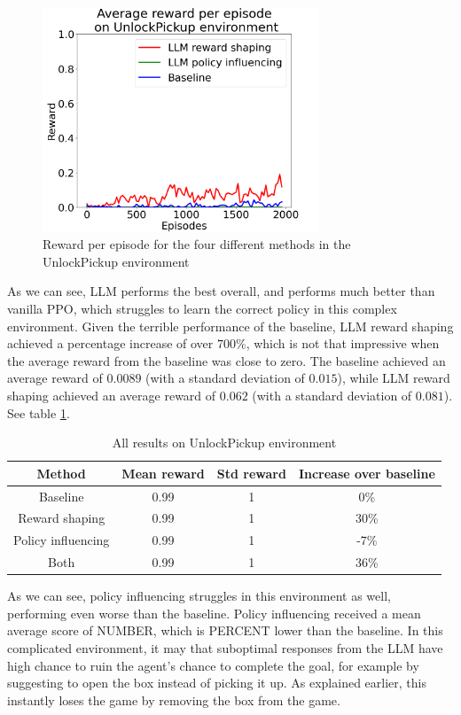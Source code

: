\documentclass[conference]{IEEEtran}
\begin{document}
\begin{figure}[h]
\centerline{\includegraphics[width=3.25in]{figure/unlockpickupresults.png}}
\caption{Reward per episode for the four different methods in the UnlockPickup environment}
\label{unlockpickupresults}
\end{figure}

As we can see, LLM performs the best overall, and performs much better than vanilla PPO, which struggles to learn the correct policy in this complex environment. Given the terrible performance of the baseline, LLM reward shaping achieved a percentage increase of over $700\%$, which is not that impressive when the average reward from the baseline was close to zero. The baseline achieved an average reward of $0.0089$ (with a standard deviation of $0.015$), while LLM reward shaping achieved an average reward of $0.062$ (with a standard deviation of $0.081$). See table \ref{unlockpickuptable}.

\begin{table}[h]
\caption{All results on UnlockPickup environment}
\begin{center}
\label{unlockpickuptable}
\begin{tabular}{c | c c c}
Method & Mean reward & Std reward & Increase over baseline \\
\hline
Baseline & 0.99 & 1 & 0\% \\
Reward shaping & 0.99 & 1 & 30\% \\
Policy influencing & 0.99 & 1 & -7\% \\
Both & 0.99 & 1 & 36\% \\
\end{tabular}
\end{center}
\end{table}

As we can see, policy influencing struggles in this environment as well, performing even worse than the baseline. Policy influencing received a mean average score of NUMBER, which is PERCENT lower than the baseline. In this complicated environment, it may that suboptimal responses from the LLM have high chance to ruin the agent's chance to complete the goal, for example by suggesting to open the box instead of picking it up. As explained earlier, this instantly loses the game by removing the box from the game.
\end{document}

